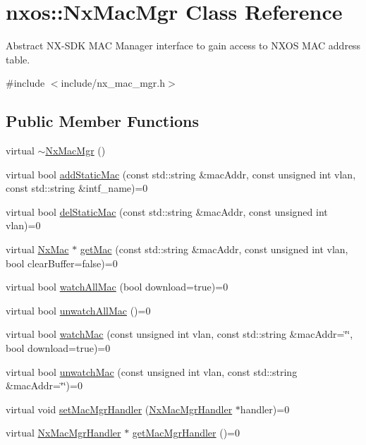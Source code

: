 \hypertarget{classnxos_1_1_nx_mac_mgr}{}\section{nxos\+:\+:Nx\+Mac\+Mgr Class Reference}
\label{classnxos_1_1_nx_mac_mgr}


Abstract N\+X-\/\+S\+DK M\+AC Manager interface to gain access to N\+X\+OS M\+AC address table.  




{\ttfamily \#include $<$include/nx\+\_\+mac\+\_\+mgr.\+h$>$}

\subsection*{Public Member Functions}
\begin{DoxyCompactItemize}
\item 
virtual \mbox{\hyperlink{classnxos_1_1_nx_mac_mgr_a850cc17a798501d3e5e1aea213bb2a41}{$\sim$\+Nx\+Mac\+Mgr}} ()
\item 
virtual bool \mbox{\hyperlink{classnxos_1_1_nx_mac_mgr_a688eeadbbf960420b24eb13883f77008}{add\+Static\+Mac}} (const std\+::string \&mac\+Addr, const unsigned int vlan, const std\+::string \&intf\+\_\+name)=0
\item 
virtual bool \mbox{\hyperlink{classnxos_1_1_nx_mac_mgr_aa8853103d4b94e6153f2b0cc5f130b77}{del\+Static\+Mac}} (const std\+::string \&mac\+Addr, const unsigned int vlan)=0
\item 
virtual \mbox{\hyperlink{classnxos_1_1_nx_mac}{Nx\+Mac}} $\ast$ \mbox{\hyperlink{classnxos_1_1_nx_mac_mgr_ab205e4819bfc3eca4396a194400d9b12}{get\+Mac}} (const std\+::string \&mac\+Addr, const unsigned int vlan, bool clear\+Buffer=false)=0
\item 
virtual bool \mbox{\hyperlink{classnxos_1_1_nx_mac_mgr_a5f4d2d56e21e3ae39969fa67774779d8}{watch\+All\+Mac}} (bool download=true)=0
\item 
virtual bool \mbox{\hyperlink{classnxos_1_1_nx_mac_mgr_aac2eae84327fa4a94616d214ac779fac}{unwatch\+All\+Mac}} ()=0
\item 
virtual bool \mbox{\hyperlink{classnxos_1_1_nx_mac_mgr_a12dde38c22d9a27e1e3bde318d418134}{watch\+Mac}} (const unsigned int vlan, const std\+::string \&mac\+Addr=\char`\"{}\char`\"{}, bool download=true)=0
\item 
virtual bool \mbox{\hyperlink{classnxos_1_1_nx_mac_mgr_af3a7878b8b604baa1e388c9b9ea9c952}{unwatch\+Mac}} (const unsigned int vlan, const std\+::string \&mac\+Addr=\char`\"{}\char`\"{})=0
\item 
virtual void \mbox{\hyperlink{classnxos_1_1_nx_mac_mgr_a06f53bd41ddb17e6cfaef5a02b00415d}{set\+Mac\+Mgr\+Handler}} (\mbox{\hyperlink{classnxos_1_1_nx_mac_mgr_handler}{Nx\+Mac\+Mgr\+Handler}} $\ast$handler)=0
\item 
virtual \mbox{\hyperlink{classnxos_1_1_nx_mac_mgr_handler}{Nx\+Mac\+Mgr\+Handler}} $\ast$ \mbox{\hyperlink{classnxos_1_1_nx_mac_mgr_a94e3fcb535f109501d319d72a24bdead}{get\+Mac\+Mgr\+Handler}} ()=0
\end{DoxyCompactItemize}


